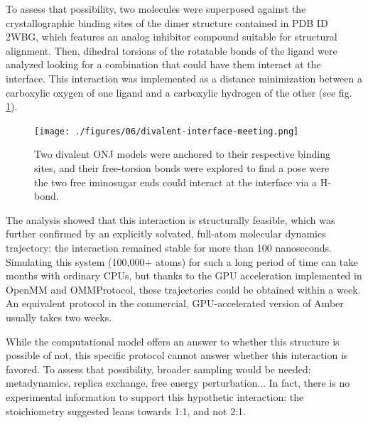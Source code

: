 To assess that possibility, two molecules were superposed against the crystallographic binding sites of the dimer structure contained in PDB ID 2WBG, which features an analog inhibitor compound suitable for structural alignment. Then, dihedral torsions of the rotatable bonds of the ligand were analyzed looking for a combination that could have them interact at the interface. This interaction was implemented as a distance minimization between a carboxylic oxygen of one ligand and a carboxylic hydrogen of the other (see fig. \ref{fig:divalent-interface}).



\begin{figure}[H] %
	\begin{Center}
		\texttt{[image: ./figures/06/divalent-interface-meeting.png]}
	\end{Center}
	\caption[Dual di-ONJ interface meeting test]{Two divalent ONJ models were anchored to their respective binding sites, and their free-torsion bonds were explored to find a pose were the two free iminosugar ends could interact at the interface via a H-bond.}
	\label{fig:divalent-interface}
\end{figure}


The analysis showed that this interaction is structurally feasible, which was further confirmed by an explicitly solvated, full-atom molecular dynamics trajectory: the interaction remained stable for more than 100 nanoseconds. Simulating this system (100,000+ atoms) for such a long period of time can take months with ordinary CPUs, but thanks to the GPU acceleration implemented in OpenMM and OMMProtocol, these trajectories could be obtained within a week. An equivalent protocol in the commercial, GPU-accelerated version of Amber usually takes two weeks.

While the computational model offers an answer to whether this structure is possible of not, this specific protocol cannot answer whether this interaction is favored. To assess that possibility, broader sampling would be needed: metadynamics, replica exchange, free energy perturbation$ \ldots $  In fact, there is no experimental information to support this hypothetic interaction: the stoichiometry suggested leans towards 1:1, and not 2:1.

